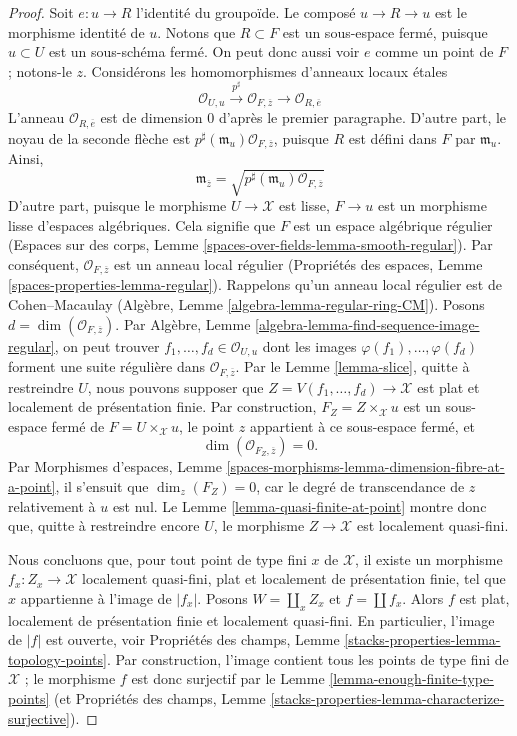 \begin{proof}
\medskip\noindent
Soit $e : u \to R$ l'identité du groupoïde. Le composé
$u \to R \to u$ est le morphisme identité de $u$.
Notons que $R \subset F$ est un sous-espace fermé, puisque $u \subset U$ est
un sous-schéma fermé. On peut donc aussi voir $e$ comme un point de $F$ ;
notons-le $z$. Considérons les homomorphismes d'anneaux locaux étales
$$
\mathcal{O}_{U, u}
\xrightarrow{p^\sharp}
\mathcal{O}_{F, \overline{z}}
\longrightarrow
\mathcal{O}_{R, \overline{e}}
$$
L'anneau $\mathcal{O}_{R, \overline{e}}$ est de dimension $0$ d'après le
premier paragraphe. D'autre part, le noyau de la seconde flèche est
$p^\sharp(\mathfrak m_u)\mathcal{O}_{F, \overline{z}}$, puisque $R$ est défini
dans $F$ par $\mathfrak m_u$. Ainsi,
$$
\mathfrak m_{\overline{z}} =
\sqrt{p^\sharp(\mathfrak m_u)\mathcal{O}_{F, \overline{z}}}
$$
D'autre part, puisque le morphisme $U \to \mathcal{X}$ est lisse,
$F \to u$ est un morphisme lisse d'espaces algébriques.
Cela signifie que $F$ est un espace algébrique régulier
(Espaces sur des corps, Lemme \ref{spaces-over-fields-lemma-smooth-regular}).
Par conséquent, $\mathcal{O}_{F, \overline{z}}$ est un anneau local régulier
(Propriétés des espaces, Lemme \ref{spaces-properties-lemma-regular}).
Rappelons qu'un anneau local régulier est de Cohen--Macaulay
(Algèbre, Lemme \ref{algebra-lemma-regular-ring-CM}).
Posons $d = \dim(\mathcal{O}_{F, \overline{z}})$. Par Algèbre,
Lemme \ref{algebra-lemma-find-sequence-image-regular}, on peut trouver
$f_1, \ldots, f_d \in \mathcal{O}_{U, u}$ dont les images
$\varphi(f_1), \ldots, \varphi(f_d)$ forment une suite régulière dans
$\mathcal{O}_{F, \overline{z}}$. Par le Lemme \ref{lemma-slice}, quitte à
restreindre $U$, nous pouvons supposer que
$Z = V(f_1, \ldots, f_d) \to \mathcal{X}$ est plat et localement de
présentation finie. Par construction,
$F_Z = Z \times_\mathcal{X} u$ est un sous-espace fermé de
$F = U \times_\mathcal{X} u$, le point $z$ appartient à ce sous-espace fermé,
et
$$
\dim(\mathcal{O}_{F_Z, \overline{z}}) = 0.
$$
Par Morphismes d'espaces,
Lemme \ref{spaces-morphisms-lemma-dimension-fibre-at-a-point},
il s'ensuit que $\dim_z(F_Z) = 0$, car le degré de transcendance de $z$
relativement à $u$ est nul. Le Lemme \ref{lemma-quasi-finite-at-point} montre
donc que, quitte à restreindre encore $U$, le morphisme
$Z \to \mathcal{X}$ est localement quasi-fini.

\medskip\noindent
Nous concluons que, pour tout point de type fini $x$ de $\mathcal{X}$, il
existe un morphisme $f_x : Z_x \to \mathcal{X}$ localement quasi-fini, plat
et localement de présentation finie, tel que $x$ appartienne à l'image de
$|f_x|$. Posons $W = \coprod_x Z_x$ et $f = \coprod f_x$. Alors $f$ est plat,
localement de présentation finie et localement quasi-fini. En particulier,
l'image de $|f|$ est ouverte, voir Propriétés des champs,
Lemme \ref{stacks-properties-lemma-topology-points}.
Par construction, l'image contient tous les points de type fini de
$\mathcal{X}$ ; le morphisme $f$ est donc surjectif par le
Lemme \ref{lemma-enough-finite-type-points} (et Propriétés des champs,
Lemme \ref{stacks-properties-lemma-characterize-surjective}).
\end{proof}

